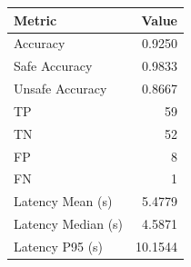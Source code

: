 \begin{table}[ht]
\centering
\begin{tabular}{lr}
\toprule
Metric & Value \\
\midrule
Accuracy & 0.9250 \\
Safe Accuracy & 0.9833 \\
Unsafe Accuracy & 0.8667 \\
TP & 59 \\
TN & 52 \\
FP & 8 \\
FN & 1 \\
Latency Mean (s) & 5.4779 \\
Latency Median (s) & 4.5871 \\
Latency P95 (s) & 10.1544 \\
\bottomrule
\end{tabular}
\end{table}